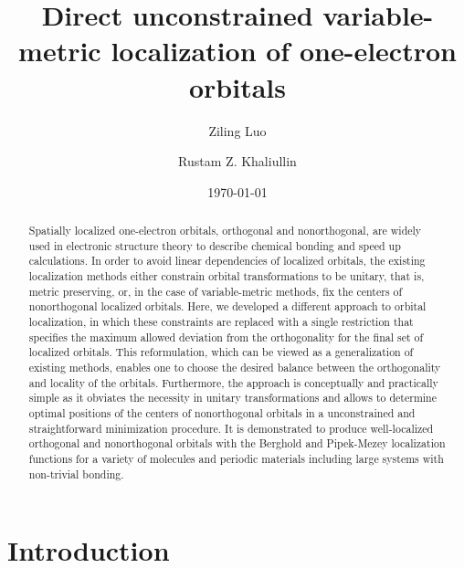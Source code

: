 \documentclass[aps,prl,reprint,amsmath,amssymb]{revtex4-1}
\begin{document}


\title{
Direct unconstrained variable-metric localization of one-electron orbitals
}

\author{Ziling Luo}
\author{Rustam Z. Khaliullin}

\date{\today}

\begin{abstract}
Spatially localized one-electron orbitals, orthogonal and nonorthogonal, are widely used in electronic structure theory to describe chemical bonding and speed up calculations. 
In order to avoid linear dependencies of localized orbitals, the existing localization methods either constrain orbital transformations to be unitary, that is, metric preserving, or, in the case of variable-metric methods, fix the centers of nonorthogonal localized orbitals. 
Here, we developed a different approach to orbital localization, in which these constraints are replaced with a single restriction that specifies the maximum allowed deviation from the orthogonality for the final set of localized orbitals. 
This reformulation, which can be viewed as a generalization of existing methods, enables one to choose the desired balance between the orthogonality and locality of the orbitals. 
Furthermore, the approach is conceptually and practically simple as it obviates the necessity in unitary transformations and allows to determine optimal positions of the centers of nonorthogonal orbitals in a unconstrained and straightforward minimization procedure. 
It is demonstrated to produce well-localized orthogonal and nonorthogonal orbitals with the Berghold and Pipek-Mezey localization functions for a variety of molecules and periodic materials including large systems with non-trivial bonding. 
\end{abstract}


\maketitle

\section{Introduction} 
\end{document}
